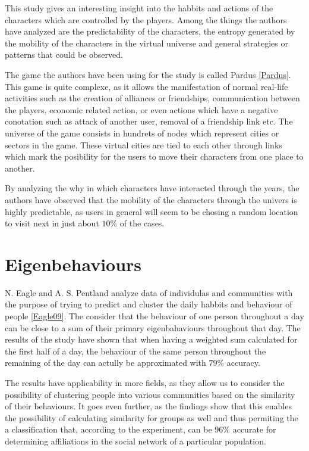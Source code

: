 This study gives an interesting insight into the habbits and actions of the
characters which are controlled by the players. Among the things the authors
have analyzed are the predictability of the characters, the entropy generated
by the mobility of the characters in the virtual universe and general
strategies or patterns that could be observed.

The game the authors have been using for the study is called
Pardus \ref{Pardus}. This game is quite complexe, as it allows the manifestation
of normal real-life activities such as the creation of alliances or friendships,
communication between the players, economic related action, or even actions
which have a negative conotation such as attack of another user, removal of a
friendship link etc. The universe of the game consists in hundrets of nodes
which represent cities or sectors in the game. These virtual cities are tied to
each other through links which mark the posibility for the users to move their
characters from one place to another.

By analyzing the why in which characters have interacted through the years, the
authors have observed that the mobility of the characters through the univers is
highly predictable, as users in general will seem to be chosing a random
location to visit next in just about $10\%$ of the cases.

\section{Eigenbehaviours}
N. Eagle and A. S. Pentland analyze data of individulas and communities with the
purpose of trying to predict and cluster the daily habbits and behaviour of
people \ref{Eagle09}. The consider that the behaviour of one person throughout a day
can be close to a sum of their primary eigenbahaviours throughout that day. The results
of the study have shown that when having a weighted sum calculated for the first
half of a day, the behaviour of the same person throughout the remaining of the
day can actully be approximated with $79\%$ accuracy. 

The results have applicability in more fields, as they allow us to consider the
possibility of clustering people into various communities based on the
similarity of their behaviours. It goes even further, as the findings show that
this enables the possibility of calculating similarity for groups as well and
thus permiting the a classification that, according to the experiment, can be
$96\%$ accurate for determining affiliations in the social network of a
particular population.

